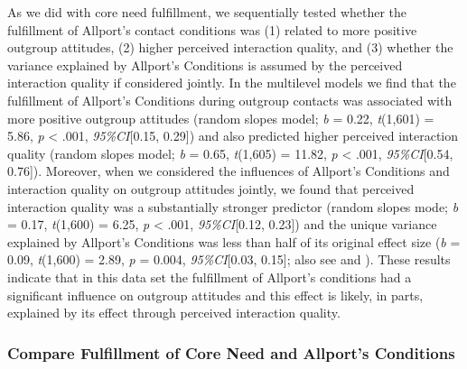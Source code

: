 As we did with core need fulfillment, we sequentially tested whether the
fulfillment of Allport's contact conditions was (1) related to more
positive outgroup attitudes, (2) higher perceived interaction quality,
and (3) whether the variance explained by Allport's Conditions is
assumed by the perceived interaction quality if considered jointly. In
the multilevel models we find that the fulfillment of Allport's
Conditions during outgroup contacts was associated with more positive
outgroup attitudes (random slopes model; \textit{b} = 0.22,
\textit{t}(1,601) = 5.86, \textit{p} \textless{} .001,
\textit{95\%CI}{[}0.15, 0.29{]}) and also predicted higher perceived
interaction quality (random slopes model; \textit{b} = 0.65,
\textit{t}(1,605) = 11.82, \textit{p} \textless{} .001,
\textit{95\%CI}{[}0.54, 0.76{]}). Moreover, when we considered the
influences of Allport's Conditions and interaction quality on outgroup
attitudes jointly, we found that perceived interaction quality was a
substantially stronger predictor (random slopes mode; \textit{b} = 0.17,
\textit{t}(1,600) = 6.25, \textit{p} \textless{} .001,
\textit{95\%CI}{[}0.12, 0.23{]}) and the unique variance explained by
Allport's Conditions was less than half of its original effect size
(\textit{b} = 0.09, \textit{t}(1,600) = 2.89, \textit{p} = 0.004,
\textit{95\%CI}{[}0.03, 0.15{]}; also see
 and
). These results indicate that in
this data set the fulfillment of Allport's conditions had a significant
influence on outgroup attitudes and this effect is likely, in parts,
explained by its effect through perceived interaction quality.

\subsubsection{Compare Fulfillment of Core Need and Allport's Conditions}

